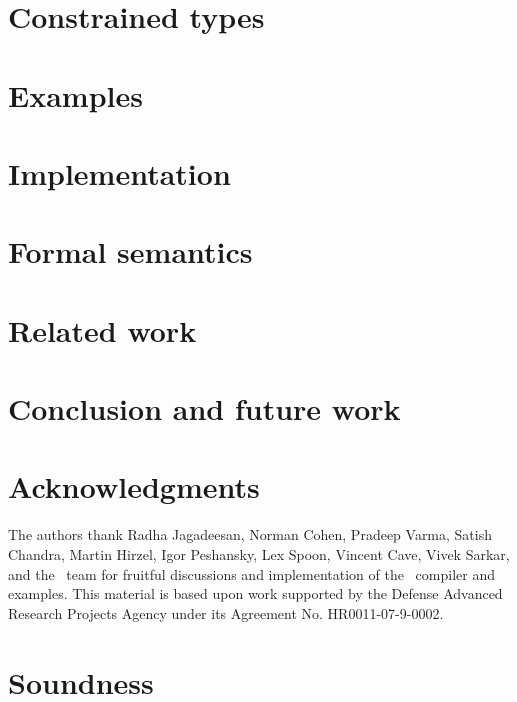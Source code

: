 \documentclass[10pt]{sigplanconf}
\begin{document}
\section{Constrained types}\label{sec:lang}

\label{method-sec}


\section{Examples}\label{sec:examples}


\section{Implementation}\label{sec:implementation}
\label{sec:impl}


\section{Formal semantics}
\label{sec:semantics}


\section{Related work}\label{sec:related}


\section{Conclusion and future work}\label{sec:future}\label{sec:conclusions}
%

\fi

\section*{Acknowledgments}

The authors thank Radha Jagadeesan,
Norman Cohen, Pra\-deep Varma,
Satish Chandra, Martin Hirzel, Igor Peshansky,
Lex Spoon, Vincent Cave, Vivek Sarkar,
and the \Xten\ team for fruitful discussions and implementation of
the \Xten\ compiler and examples.
This material is based upon work supported by the Defense
Advanced Research Projects Agency under its Agreement No.
HR0011-07-9-0002.
\fi





\appendix

\section{Soundness}
\label{sec:proof}



% 
\end{document}
